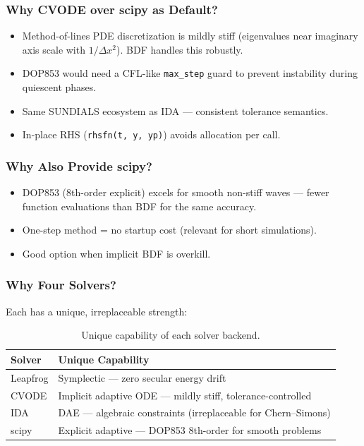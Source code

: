 \subsubsection{Why CVODE over scipy as Default?}
\label{sec:cvode-vs-scipy}

\begin{itemize}
  \item Method-of-lines PDE discretization is mildly stiff (eigenvalues near
    imaginary axis scale with $1/\Delta x^2$). BDF handles this robustly.
  \item DOP853 would need a CFL-like \texttt{max\_step} guard to prevent instability
    during quiescent phases.
  \item Same SUNDIALS ecosystem as IDA --- consistent tolerance semantics.
  \item In-place RHS (\texttt{rhsfn(t, y, yp)}) avoids allocation per call.
\end{itemize}

\subsubsection{Why Also Provide scipy?}
\label{sec:why-scipy}

\begin{itemize}
  \item DOP853 (8th-order explicit) excels for smooth non-stiff waves --- fewer
    function evaluations than BDF for the same accuracy.
  \item One-step method = no startup cost (relevant for short simulations).
  \item Good option when implicit BDF is overkill.
\end{itemize}

\subsubsection{Why Four Solvers?}
\label{sec:why-four}

Each has a unique, irreplaceable strength:

\begin{table}[htbp]
\centering
\caption{Unique capability of each solver backend.}
\label{tab:unique-capabilities}
\begin{tabular}{@{}ll@{}}
\toprule
Solver & Unique Capability \\
\midrule
Leapfrog & Symplectic --- zero secular energy drift \\
CVODE & Implicit adaptive ODE --- mildly stiff, tolerance-controlled \\
IDA & DAE --- algebraic constraints (irreplaceable for Chern--Simons) \\
scipy & Explicit adaptive --- DOP853 8th-order for smooth problems \\
\bottomrule
\end{tabular}
\end{table}

